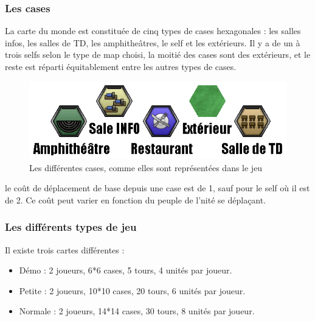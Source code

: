 \subsubsection{Les cases}
La carte du monde est constituée de cinq types de cases hexagonales : les salles infos, les salles de TD, les amphitheâtres, le self et les extérieurs.
Il y a de un à trois selfs selon le type de map choisi, la moitié des cases sont des extérieurs, et le reste est réparti équitablement entre les autres types de cases.
\begin{figure}[!h]
\centering
\includegraphics[width=.7\textwidth]{Parties/Images/Terrains.png}
\caption{Les différentes cases, comme elles sont représentées dans le jeu}
\label{fig:Terrains}
\end{figure}
le coût de déplacement de base depuis une case est de 1, sauf pour le self où il est de 2. Ce coût peut varier en fonction du peuple de l'nité se déplaçant.

\subsubsection{Les différents types de jeu}
Il existe trois cartes différentes :
\begin{itemize}
\item Démo : 2 joueurs, 6*6 cases, 5 tours, 4 unités par joueur.
\item Petite : 2 joueurs, 10*10 cases, 20 tours, 6 unités par joueur.
\item Normale : 2 joueurs, 14*14 cases, 30 tours, 8 unités par joueur.
\end{itemize}